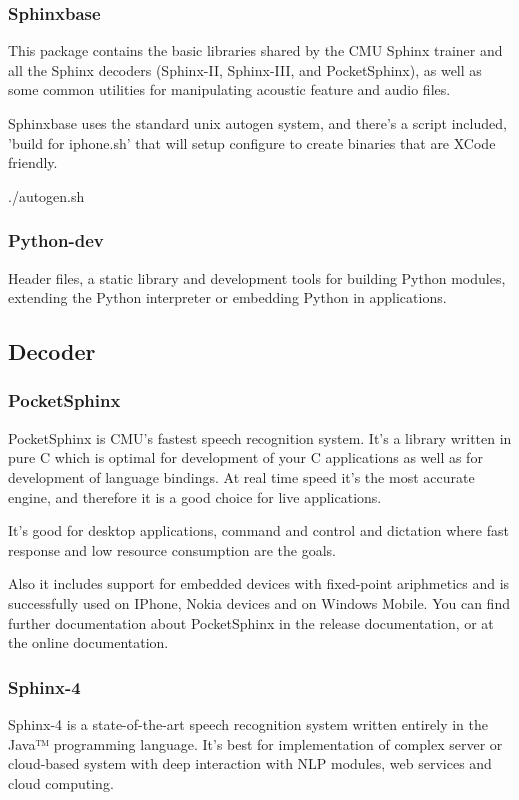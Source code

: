 \documentclass[12pt,a4paper,oldfontcommands]{memoir}
\begin{document}
\subsubsection{Sphinxbase}
This package contains the basic libraries shared by the CMU Sphinx
trainer and all the Sphinx decoders (Sphinx-II, Sphinx-III, and
PocketSphinx), as well as some common utilities for manipulating
acoustic feature and audio files.

Sphinxbase uses the standard unix autogen system, and there's a script
included, 'build for iphone.sh' that will setup configure to create
binaries that are XCode friendly.

 ./autogen.sh

\subsubsection{Python-dev}
Header files, a static library and development tools for building
 Python modules, extending the Python interpreter or embedding Python
 in applications\cite{20}.

\subsection{Decoder}
\subsubsection{PocketSphinx}
 PocketSphinx is CMU’s fastest speech recognition system. It’s a library written in pure C which is optimal for development of your C applications as well as for development of language bindings. At real time speed it’s the most accurate engine, and therefore it is a good choice for live applications.

It's good for desktop applications, command and control and dictation where fast response and low resource consumption are the goals.

Also it includes support for embedded devices with fixed-point ariphmetics and is successfully used on IPhone, Nokia devices and on Windows Mobile. You can find further documentation about PocketSphinx in the release documentation, or at the online  documentation\cite{29}. 

\subsubsection{Sphinx-4}
Sphinx-4 is a state-of-the-art speech recognition system written entirely in the Java™ programming language. It's best for implementation of complex server or cloud-based system with deep interaction with NLP modules, web services and cloud computing\cite{29}.
\end{document}

